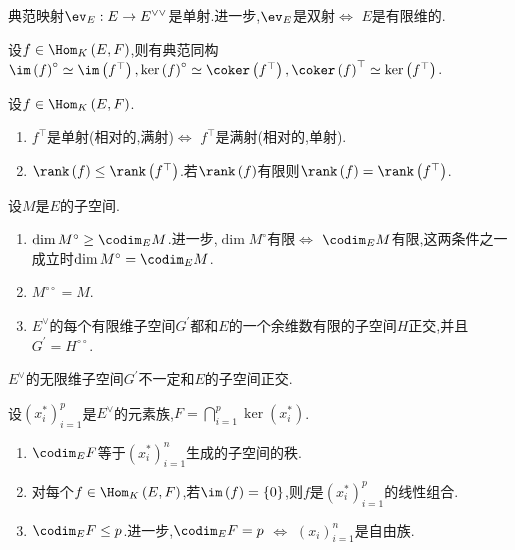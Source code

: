 \begin{theorem}{}{}
	典范映射$\ev_{E}:E\to E^{\vee\vee}$是单射.进一步,$\ev_{E}$是双射$\iff$ $E$是有限维的.
\end{theorem}

\begin{proposition}{}{}
	设$f\in\Hom_{K}\left(E,F\right)$,则有典范同构$\im\left(f\right)^{\circ}\simeq\im\left(f^{\top}\right),\ker\left(f\right)^{\circ}\simeq\coker\left(f^{\top}\right),\coker\left(f\right)^{\top}\simeq\ker\left(f^{\top}\right)$.
\end{proposition}

\begin{proposition}{}{}
	设$f\in\Hom_{K}\left(E,F\right)$.
	\begin{enumerate}
		\item $f^{\top}$是单射(相对的,满射)$\iff$ $f^{\top}$是满射(相对的,单射).
		\item $\rank\left(f\right)\leq\rank\left(f^{\top}\right)$.若$\rank\left(f\right)$有限则$\rank\left(f\right)=\rank\left(f^{\top}\right)$.
	\end{enumerate}
\end{proposition}

\begin{theorem}{}{}
	设$M$是$E$的子空间.
	\begin{enumerate}
		\item $\dim M^{\circ}\geq\codim_{E}M$.进一步,$\dim M^{\circ}$有限$\iff$ $\codim_{E}M$有限,这两条件之一成立时$\dim M^{\circ}=\codim_{E}M$.
		\item $M^{\circ\circ}=M$.
		\item $E^{\vee}$的每个有限维子空间$G^{\prime}$都和$E$的一个余维数有限的子空间$H$正交,并且$G^{\prime}=H^{\circ\circ}$.
	\end{enumerate}
\end{theorem}

\begin{remark}{}{}
	$E^{\vee}$的无限维子空间$G^{\prime}$不一定和$E$的子空间正交.
\end{remark}

\begin{corollary}{}{}
	设$\left(x_{i}^{\ast}\right)_{i=1}^{p}$是$E^{\vee}$的元素族,$F=\bigcap\limits_{i=1}^{p}\ker\left(x_{i}^{\ast}\right)$.
	\begin{enumerate}
		\item $\codim_{E}F$等于$\left(x_{i}^{\ast}\right)_{i=1}^{n}$生成的子空间的秩.
		\item 对每个$f\in\Hom_{K}\left(E,F\right)$,若$\im\left(f\right)=\left\{0\right\}$,则$f$是$\left(x_{i}^{\ast}\right)_{i=1}^{p}$的线性组合.
		\item $\codim_{E}F\leq p$.进一步,$\codim_{E}F=p$ $\iff$ $\left(x_{i}\right)_{i=1}^{n}$是自由族.
	\end{enumerate}
\end{corollary}

